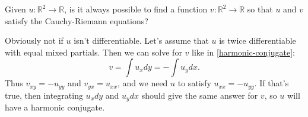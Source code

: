 \documentclass{homework}
\begin{document}
\begin{problem}\label{harmonic-necessary}Given $u : \mathbb{R}^2 \to \mathbb{R}$, is it always possible to
  find a function $v : \mathbb{R}^2 \to \mathbb{R}$ so that $u$ and
  $v$ satisfy the Cauchy-Riemann equations?
\end{problem}
\begin{solution}
Obviously not if $u$ isn't differentiable. Let's assume that $u$ is twice differentiable with equal mixed partials. Then we can solve for $v$ like in \ref{harmonic-conjugate}:
\[v = \int u_x dy = -\int u_y dx.\]
Thus $v_{xy} = -u_{yy}$ and $v_{yx} = u_{xx}$, and we need $u$ to satisfy $u_{xx} = -u_{yy}$. If that's true, then integrating $u_xdy$ and $u_ydx$ should give the same answer for $v$, so $u$ will have a harmonic conjugate.
\end{solution}
\end{document}
